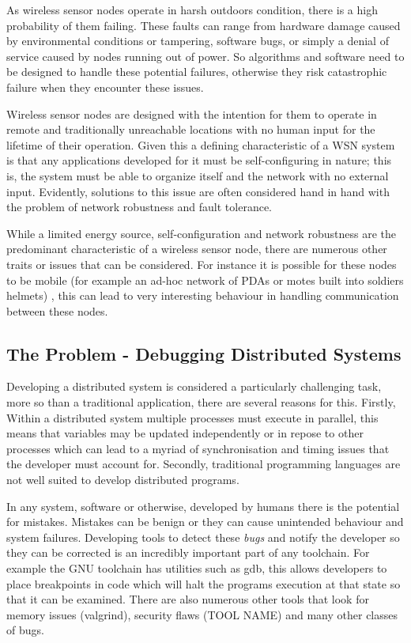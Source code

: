 As wireless sensor nodes operate in harsh outdoors condition\cite{SzewczykPMC04, Werner-Allen:2006:FYV:1298455.1298491}, there is a high probability of them failing. These faults can range from hardware damage caused by environmental conditions or tampering, software bugs, or simply a denial of service caused by nodes running out of power. So algorithms and software need to be designed to handle these potential failures, otherwise they risk catastrophic failure when they encounter these issues.

Wireless sensor nodes are designed with the intention for them to operate in remote and traditionally unreachable locations with no human input for the lifetime of their operation\cite{1437066}. Given this a defining characteristic of a WSN system is that any applications developed for it must be self-configuring in nature; this is, the system must be able to organize itself and the network with no external input\cite{1368897}. Evidently, solutions to this issue are often considered hand in hand with the problem of network robustness and fault tolerance.   

While a limited energy source, self-configuration and network robustness are the predominant characteristic of a wireless sensor node, there are numerous other traits or issues that can be considered. For instance it is possible for these nodes to be mobile (for example an ad-hoc network of PDAs or motes built into soldiers helmets) \cite{4224091}, this can lead to very interesting behaviour in handling communication between these nodes.


\subsection{The Problem - Debugging Distributed Systems}

Developing a distributed system is considered a particularly challenging task, more so than a traditional application, there are several reasons for this. Firstly, Within a distributed system multiple processes must execute in parallel, this means that variables may be updated independently or in repose to other processes which can lead to a myriad of synchronisation and timing issues that the developer must account for. Secondly, traditional programming languages are not well suited to develop distributed programs\cite{93692,345131}.

In any system, software or otherwise, developed by humans there is the potential for mistakes. Mistakes can be benign or they can cause unintended behaviour and system failures. Developing tools to detect these \emph{bugs} and notify the developer so they can be corrected is an incredibly important part of any toolchain. For example the GNU toolchain has utilities such as gdb\cite{?}, this allows developers to place breakpoints in code which will halt the programs execution at that state so that it can be examined. There are also numerous other tools that look for memory issues (valgrind\cite{Bond:2007:TBA:1297105.1297057,Nethercote:2007:SBM:1254810.1254820,seward2004valgrind}), security flaws (TOOL NAME\cite{?}) and many other classes of bugs.

